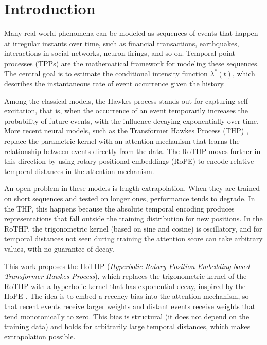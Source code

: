 \chapter{Introduction}
\label{cap:introducao}

Many real-world phenomena can be modeled as sequences of events that happen at irregular instants over time, such as financial transactions, earthquakes, interactions in social networks, neuron firings, and so on. Temporal point processes (TPPs) are the mathematical framework for modeling these sequences. The central goal is to estimate the conditional intensity function $\lambda^*(t)$, which describes the instantaneous rate of event occurrence given the history.

Among the classical models, the Hawkes process \cite{hawkes_spectra_1971} stands out for capturing self-excitation, that is, when the occurrence of an event temporarily increases the probability of future events, with the influence decaying exponentially over time. More recent neural models, such as the Transformer Hawkes Process (\gls{THP}) \cite{zuo_transformer_2021}, replace the parametric kernel with an attention mechanism that learns the relationship between events directly from the data. The \gls{RoTHP} \cite{dai_rotary_2026} moves further in this direction by using rotary positional embeddings (RoPE) \cite{dai_rotary_2026} to encode relative temporal distances in the attention mechanism.

An open problem in these models is length extrapolation. When they are trained on short sequences and tested on longer ones, performance tends to degrade. In the THP, this happens because the absolute temporal encoding produces representations that fall outside the training distribution for new positions. In the RoTHP, the trigonometric kernel (based on sine and cosine) is oscillatory, and for temporal distances not seen during training the attention score can take arbitrary values, with no guarantee of decay.

This work proposes the \gls{HoTHP} (\textit{Hyperbolic Rotary Position Embedding-based Transformer Hawkes Process}), which replaces the trigonometric kernel of the RoTHP with a hyperbolic kernel that has exponential decay, inspired by the \gls{HoPE} \cite{dai_hope_2025}. The idea is to embed a recency bias into the attention mechanism, so that recent events receive larger weights and distant events receive weights that tend monotonically to zero. This bias is structural (it does not depend on the training data) and holds for arbitrarily large temporal distances, which makes extrapolation possible.

